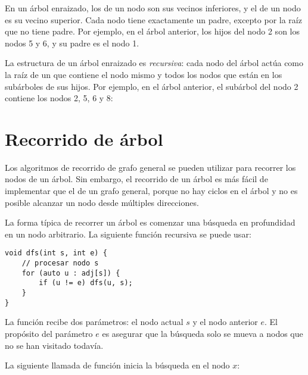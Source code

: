 En un árbol enraizado, los  de un nodo
son sus vecinos inferiores, y el  de un nodo
es su vecino superior.
Cada nodo tiene exactamente un padre,
excepto por la raíz que no tiene padre.
Por ejemplo, en el árbol anterior,
los hijos del nodo 2 son los nodos 5 y 6,
y su padre es el nodo 1.


La estructura de un árbol enraizado es \emph{recursiva}:
cada nodo del árbol actúa como la raíz de un 
que contiene el nodo mismo y todos los nodos
que están en los subárboles de sus hijos.
Por ejemplo, en el árbol anterior, el subárbol del nodo 2
contiene los nodos 2, 5, 6 y 8:
\begin{center}
\end{center}

\section{Recorrido de árbol}

Los algoritmos de recorrido de grafo general
se pueden utilizar para recorrer los nodos de un árbol.
Sin embargo, el recorrido de un árbol es más fácil de implementar que
el de un grafo general, porque
no hay ciclos en el árbol y no es
posible alcanzar un nodo desde múltiples direcciones.

La forma típica de recorrer un árbol es comenzar
una búsqueda en profundidad en un nodo arbitrario.
La siguiente función recursiva se puede usar:

\begin{lstlisting}
void dfs(int s, int e) {
    // procesar nodo s
    for (auto u : adj[s]) {
        if (u != e) dfs(u, s);
    }
}
\end{lstlisting}

La función recibe dos parámetros: el nodo actual $s$
y el nodo anterior $e$.
El propósito del parámetro $e$ es asegurar
que la búsqueda solo se mueva a nodos
que no se han visitado todavía.

La siguiente llamada de función inicia la búsqueda
en el nodo $x$:

